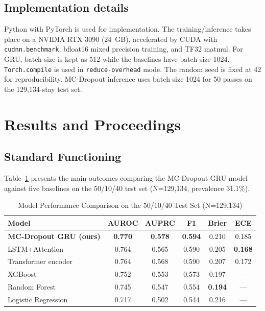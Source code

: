 \documentclass[runningheads]{llncs}
\begin{document}
\subsection{Implementation details}

Python with PyTorch is used for implementation. The training/inference takes place on a NVIDIA RTX 3090 (24~GB), accelerated by CUDA with \texttt{cudnn.benchmark}, bfloat16 mixed precision training, and TF32 matmul. For GRU, batch size is kept as 512 while the baselines have batch size 1024. \texttt{Torch.compile} is used in \texttt{reduce-overhead} mode. The random seed is fixed at 42 for reproducibility. MC-Dropout inference uses batch size 1024 for 50 passes on the 129,134-stay test set.

\section{Results and Proceedings}

\subsection{Standard Functioning}

Table~\ref{tab:main_results} presents the main outcomes comparing the MC-Dropout GRU model against five baselines on the 50/10/40 test set (N=129,134, prevalence 31.1\%).

\begin{table}[t]
\caption{Model Performance Comparison on the 50/10/40 Test Set (N=129{,}134)}
\label{tab:main_results}
\centering
\begin{tabular}{lccccc}
\toprule
\textbf{Model} & \textbf{AUROC} & \textbf{AUPRC} & \textbf{F1} & \textbf{Brier} & \textbf{ECE} \\
\midrule
\textbf{MC-Dropout GRU (ours)} & \textbf{0.770} & \textbf{0.578} & \textbf{0.594} & 0.210 & 0.185 \\
LSTM+Attention                 & 0.764 & 0.565 & 0.590 & 0.205 & \textbf{0.168} \\
Transformer encoder            & 0.764 & 0.568 & 0.590 & 0.207 & 0.172 \\
\midrule
XGBoost                        & 0.752 & 0.553 & 0.573 & 0.197 & --- \\
Random Forest                  & 0.745 & 0.547 & 0.554 & \textbf{0.194} & --- \\
Logistic Regression            & 0.717 & 0.502 & 0.544 & 0.216 & --- \\
\bottomrule
\end{tabular}
\end{table}
\end{document}
